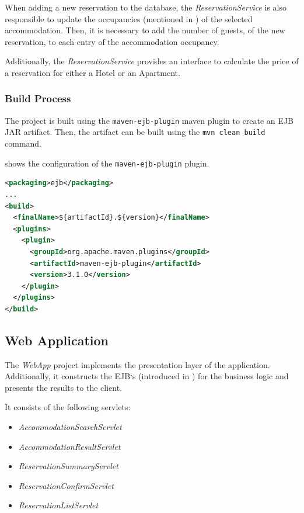 When adding a new reservation to the database, the \textit{ReservationService} is also responsible to update the occupancies (mentioned in ) of the selected accommodation. Then, it is necessary to add the number of guests, of the new reservation, to each entry of the accommodation occupancy.

Additionally, the \textit{ReservationService} provides an interface to calculate the price of a reservation for either a Hotel or an Apartment.

\newpage
\subsubsection{Build Process}\label{sec:02_design_beans_build}
The project is built using the \texttt{maven-ejb-plugin} maven plugin to create an EJB JAR artifact.
Then, the artifact can be built using the \texttt{mvn clean build} command.

 shows the configuration of the \texttt{maven-ejb-plugin} plugin.
\begin{lstlisting}[label=lst:02_design_ejb_buildprocess_pluginconfig, caption=\texttt{maven-ejb-plugin} plugin configuration, language=xml]
<packaging>ejb</packaging>
...
<build>
  <finalName>${artifactId}.${version}</finalName>
  <plugins>
    <plugin>
      <groupId>org.apache.maven.plugins</groupId>
      <artifactId>maven-ejb-plugin</artifactId>
      <version>3.1.0</version>
    </plugin>
  </plugins>
</build>
\end{lstlisting}



\subsection{Web Application}\label{sec:02_design_web}
The \textit{WebApp} project implements the presentation layer of the application. Additionally, it constructs the EJB`s (introduced in ) for the business logic and presents the results to the client.
 
It consists of the following servlets:
\begin{itemize}
\item \textit{AccommodationSearchServlet}
\item \textit{AccommodationResultServlet}
\item \textit{ReservationSummaryServlet}
\item \textit{ReservationConfirmServlet}
\item \textit{ReservationListServlet}
\end{itemize}

